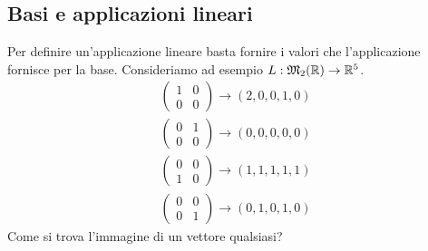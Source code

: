 \subsection{Basi e applicazioni lineari}
Per definire un'applicazione lineare basta fornire i valori che l'applicazione fornisce per la base. Consideriamo ad esempio $L : \mathfrak{M}_2 (\mathbb{R}) \to \mathbb{R}^5$.
\begin{gather*}
\begin{pmatrix}
1 & 0 \\
0 & 0
\end{pmatrix}
\to (2, 0, 0, 1, 0) \\
\begin{pmatrix}
0 & 1 \\
0 & 0
\end{pmatrix}
\to (0, 0, 0, 0, 0) \\
\begin{pmatrix}
0 & 0 \\
1 & 0
\end{pmatrix}
\to (1, 1, 1, 1, 1) \\
\begin{pmatrix}
0 & 0 \\
0 & 1
\end{pmatrix}
\to (0, 1, 0, 1, 0)
\end{gather*}
Come si trova l'immagine di un vettore qualsiasi?
